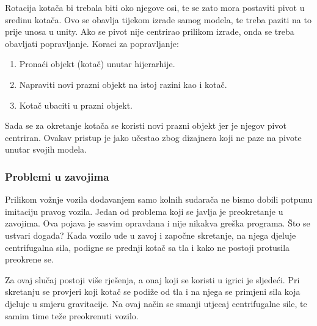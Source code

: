 Rotacija kotača bi trebala biti oko njegove osi, te se zato mora postaviti pivot u sredinu kotača. Ovo se obavlja tijekom izrade samog modela, te treba paziti na to prije unosa u unity. Ako se pivot nije centrirao prilikom izrade, onda se treba obavljati popravljanje. Koraci za popravljanje:

\begin{enumerate}
	\item Pronaći objekt (kotač) unutar hijerarhije.
	\item Napraviti novi prazni objekt na istoj razini kao i kotač.
	\item Kotač ubaciti u prazni objekt.
\end{enumerate}
Sada se za okretanje kotača se koristi novi prazni objekt jer je njegov pivot centriran. Ovakav pristup je jako učestao zbog dizajnera koji ne paze na pivote unutar svojih modela.

\subsubsection{Problemi u zavojima}
Prilikom vožnje vozila dodavanjem samo kolnih sudarača ne bismo dobili potpunu imitaciju pravog vozila. Jedan od problema koji se javlja je preokretanje u zavojima. Ova pojava je sasvim opravdana i nije nikakva greška programa. Što se ustvari događa? Kada vozilo uđe u zavoj i započne skretanje, na njega djeluje centrifugalna sila, podigne se prednji kotač sa tla i kako ne postoji protusila preokrene se.

Za ovaj slučaj postoji više rješenja, a onaj koji se koristi u igrici je sljedeći. Pri skretanju se provjeri koji kotač se podiže od tla i na njega se primjeni sila koja djeluje u smjeru gravitacije. Na ovaj način se smanji utjecaj centrifugalne sile, te samim time teže preokrenuti vozilo.